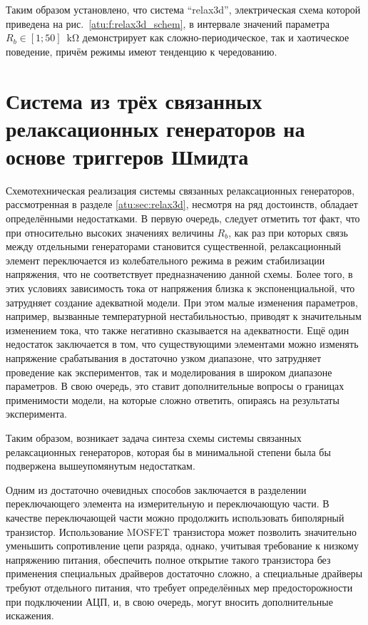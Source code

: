 Таким образом установлено, что
система ``relax3d'', электрическая схема которой приведена на рис.~\ref{atu:f:relax3d_schem},
в интервале значений параметра $R_b \in [1;50]\;\SI{}{\kilo\ohm}$
демонстрирует как сложно-периодическое, так и хаотическое поведение,
причём режимы имеют тенденцию к чередованию.

\section{Система из трёх связанных релаксационных генераторов на основе триггеров Шмидта}
\label{atu:sec:relax3ds}

Схемотехническая реализация системы связанных релаксационных генераторов,
рассмотренная в разделе \ref{atu:sec:relax3d}, несмотря на ряд достоинств,
обладает определёнными недостатками. В первую очередь, следует отметить
тот факт, что при относительно высоких значениях величины $R_b$,
как раз при которых связь между отдельными генераторами становится существенной,
релаксационный элемент переключается из колебательного режима в режим
стабилизации напряжения, что не соответствует предназначению данной схемы.
Более того, в этих условиях зависимость тока от напряжения близка к экспоненциальной,
что затрудняет создание адекватной модели. При этом малые изменения параметров,
например, вызванные температурной нестабильностью, приводят к значительным изменением
тока, что также негативно сказывается на адекватности. Ещё один недостаток
заключается в том, что существующими элементами можно изменять напряжение срабатывания
в достаточно узком диапазоне, что затрудняет проведение как экспериментов,
так и моделирования в широком диапазоне параметров. В свою очередь,
это ставит дополнительные вопросы о границах применимости модели, на которые сложно
ответить, опираясь на результаты эксперимента.

Таким образом, возникает задача синтеза схемы системы связанных
релаксационных генераторов, которая бы в минимальной степени была бы
подвержена вышеупомянутым недостаткам.

Одним из достаточно очевидных способов заключается
в разделении переключающего элемента
на измерительную и переключающую части.
В качестве переключающей части можно продолжить использовать биполярный
транзистор. Использование MOSFET транзистора может позволить
значительно уменьшить сопротивление цепи разряда, однако,
учитывая требование к низкому напряжению питания,
обеспечить полное открытие такого транзистора
без применения специальных драйверов достаточно сложно,
а специальные драйверы требуют отдельного питания,
что требует определённых мер предосторожности при подключении АЦП,
и, в свою очередь, могут вносить дополнительные искажения.

